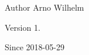 \begin{DoxyAuthor}{Author}
Arno Wilhelm 
\end{DoxyAuthor}
\begin{DoxyVersion}{Version}
1. 
\end{DoxyVersion}
\begin{DoxySince}{Since}
2018-\/05-\/29 
\end{DoxySince}
